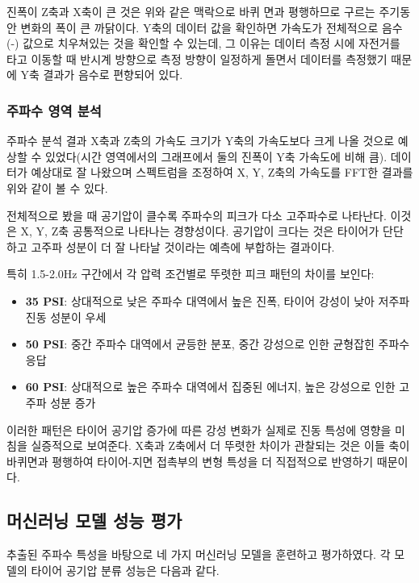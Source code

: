 \documentclass[12pt,a4paper]{article}
\begin{document}
진폭이 Z축과 X축이 큰 것은 위와 같은 맥락으로 바퀴 면과 평행하므로 구르는 주기동안 변화의 폭이 큰 까닭이다. Y축의 데이터 값을 확인하면 가속도가 전체적으로 음수(-) 값으로 치우쳐있는 것을 확인할 수 있는데, 그 이유는 데이터 측정 시에 자전거를 타고 이동할 때 반시계 방향으로 측정 방향이 일정하게 돌면서 데이터를 측정했기 때문에 Y축 결과가 음수로 편향되어 있다.

\subsubsection{주파수 영역 분석}
\label{subsubsec:frequency_domain}

주파수 분석 결과 X축과 Z축의 가속도 크기가 Y축의 가속도보다 크게 나올 것으로 예상할 수 있었다(시간 영역에서의 그래프에서 둘의 진폭이 Y축 가속도에 비해 큼). 데이터가 예상대로 잘 나왔으며 스펙트럼을 조정하여 X, Y, Z축의 가속도를 FFT한 결과를 위와 같이 볼 수 있다.

전체적으로 봤을 때 공기압이 클수록 주파수의 피크가 다소 고주파수로 나타난다. 이것은 X, Y, Z축 공통적으로 나타나는 경향성이다. 공기압이 크다는 것은 타이어가 단단하고 고주파 성분이 더 잘 나타날 것이라는 예측에 부합하는 결과이다.

특히 1.5-2.0Hz 구간에서 각 압력 조건별로 뚜렷한 피크 패턴의 차이를 보인다:

\begin{itemize}
    \item \textbf{35 PSI}: 상대적으로 낮은 주파수 대역에서 높은 진폭, 타이어 강성이 낮아 저주파 진동 성분이 우세
    \item \textbf{50 PSI}: 중간 주파수 대역에서 균등한 분포, 중간 강성으로 인한 균형잡힌 주파수 응답
    \item \textbf{60 PSI}: 상대적으로 높은 주파수 대역에서 집중된 에너지, 높은 강성으로 인한 고주파 성분 증가
\end{itemize}

이러한 패턴은 타이어 공기압 증가에 따른 강성 변화가 실제로 진동 특성에 영향을 미침을 실증적으로 보여준다. X축과 Z축에서 더 뚜렷한 차이가 관찰되는 것은 이들 축이 바퀴면과 평행하여 타이어-지면 접촉부의 변형 특성을 더 직접적으로 반영하기 때문이다.


\subsection{머신러닝 모델 성능 평가}
\label{subsec:ml_results}

추출된 주파수 특성을 바탕으로 네 가지 머신러닝 모델을 훈련하고 평가하였다. 각 모델의 타이어 공기압 분류 성능은 다음과 같다.
\end{document}
